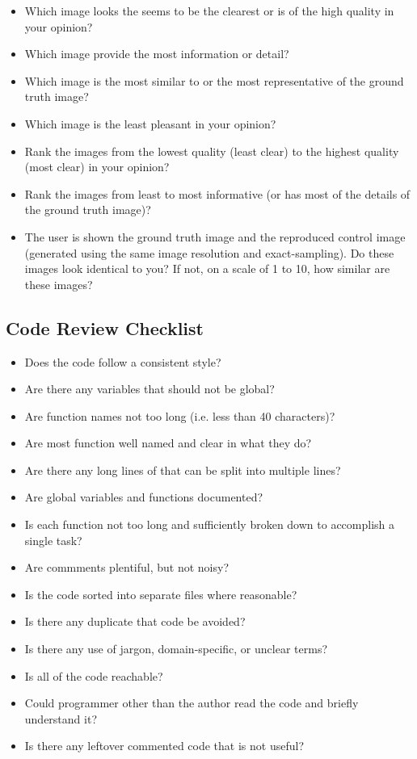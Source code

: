 \documentclass[12pt, titlepage]{article}
\begin{document}
\begin{itemize}
  \item{Which image looks the seems to be the clearest or is of the high quality in your opinion?}
  \item{Which image provide the most information or detail?}
  \item{Which image is the most similar to or the most representative of the ground truth image?}
  \item{Which image is the least pleasant in your opinion?}
  \item{Rank the images from the lowest quality (least clear) to the highest quality (most clear) in your opinion?}
  \item{Rank the images from least to most informative (or has most of the details of the ground truth image)?}
  \item{The user is shown the ground truth image and the reproduced control image 
  (generated using the same image resolution and exact-sampling). 
  Do these images look identical to you? If not, on a scale of 1 to 10, how similar are these images?}
\end{itemize}

\subsection{Code Review Checklist} \label{checklist_codeReview}

\begin{itemize}
  \item{Does the code follow a consistent style?}
  \item{Are there any variables that should not be global?}
  \item{Are function names not too long (i.e. less than 40 characters)?}
  \item{Are most function well named and clear in what they do?}
  \item{Are there any long lines of that can be split into multiple lines?}
  \item{Are global variables and functions documented?}
  \item{Is each function not too long and sufficiently broken down to accomplish a single task?}
  \item{Are commments plentiful, but not noisy?}
  \item{Is the code sorted into separate files where reasonable?}
  \item{Is there any duplicate that code be avoided?}
  \item{Is there any use of jargon, domain-specific, or unclear terms?}
  \item{Is all of the code reachable?}
  \item{Could programmer other than the author read the code and briefly understand it?}
  \item{Is there any leftover commented code that is not useful?}
\end{itemize}
\end{document}
